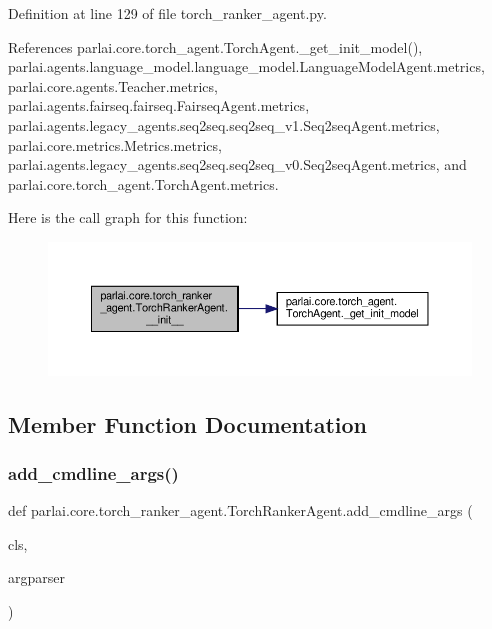Definition at line 129 of file torch\+\_\+ranker\+\_\+agent.\+py.



References parlai.\+core.\+torch\+\_\+agent.\+Torch\+Agent.\+\_\+get\+\_\+init\+\_\+model(), parlai.\+agents.\+language\+\_\+model.\+language\+\_\+model.\+Language\+Model\+Agent.\+metrics, parlai.\+core.\+agents.\+Teacher.\+metrics, parlai.\+agents.\+fairseq.\+fairseq.\+Fairseq\+Agent.\+metrics, parlai.\+agents.\+legacy\+\_\+agents.\+seq2seq.\+seq2seq\+\_\+v1.\+Seq2seq\+Agent.\+metrics, parlai.\+core.\+metrics.\+Metrics.\+metrics, parlai.\+agents.\+legacy\+\_\+agents.\+seq2seq.\+seq2seq\+\_\+v0.\+Seq2seq\+Agent.\+metrics, and parlai.\+core.\+torch\+\_\+agent.\+Torch\+Agent.\+metrics.

Here is the call graph for this function\+:
\nopagebreak
\begin{figure}[H]
\begin{center}
\leavevmode
\includegraphics[width=350pt]{classparlai_1_1core_1_1torch__ranker__agent_1_1TorchRankerAgent_acde404a79bf3678bb52d3e6c3ee5244a_cgraph}
\end{center}
\end{figure}


\subsection{Member Function Documentation}
\mbox{\label{classparlai_1_1core_1_1torch__ranker__agent_1_1TorchRankerAgent_a8b16043428bbb29ee4a3ed28c2bbb472}} 
\subsubsection{\texorpdfstring{add\+\_\+cmdline\+\_\+args()}{add\_cmdline\_args()}}
{\footnotesize\ttfamily def parlai.\+core.\+torch\+\_\+ranker\+\_\+agent.\+Torch\+Ranker\+Agent.\+add\+\_\+cmdline\+\_\+args (\begin{DoxyParamCaption}\item[{}]{cls,  }\item[{}]{argparser }\end{DoxyParamCaption})}

